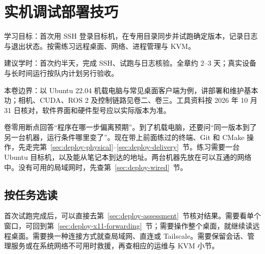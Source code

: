 \chapter{实机调试部署技巧}
\label{chap:deployment}

\begin{introduction}
  \item 学习目标：首次用 SSH 登录目标机，在专用目录同步并试跑确定版本，记录日志与退出状态。按需练习远程桌面、网络、进程管理与 KVM。
  \item 建议学时：首次约半天，完成 SSH、试跑与日志核验。全章约 2--3 天；真实设备与长时间运行按队内计划另行验收。
  \item 本卷边界：以 Ubuntu 22.04 机载电脑与常见桌面客户端为例，讲部署和维护基本功；相机、CUDA、ROS 2 及控制链路见卷二、卷三。工具资料按 2026 年 10 月 31 日核对，软件界面和硬件型号应以实际版本为准。
\end{introduction}

\begingroup
\setlength{\emergencystretch}{3em}

卷零用断点回答“程序在哪一步偏离预期”。到了机载电脑，还要问“同一版本到了另一台机器，运行条件哪里变了”。现在带上前面练过的终端、Git 和 CMake 操作，先走完第~\ref{sec:deploy-physical}--\ref{sec:deploy-delivery}~节。练习需要一台 Ubuntu 目标机，以及能从笔记本到达的地址。两台机器先放在可以互通的网络中。没有可用的局域网时，先查第~\ref{sec:deploy-wired}~节。





\section*{按任务选读}
{}

首次试跑完成后，可以直接去第~\ref{sec:deploy-assessment}~节核对结果。需要看单个窗口，可回到第~\ref{sec:deploy-x11-forwarding}~节；需要操作整个桌面，就继续读远程桌面。需要换一种连接方式就查局域网、直连或 Tailscale。需要保留会话、管理服务或在系统网络不可用时救援，再查相应的运维与 KVM 小节。






